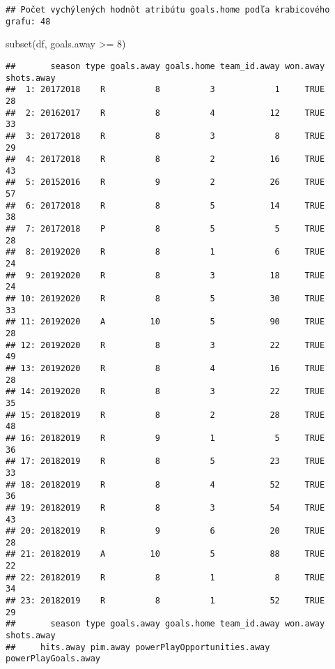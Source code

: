 \documentclass[
]{article}
\newenvironment{Shaded}{\begin{snugshade}}{\end{snugshade}}
\newcommand{\DecValTok}[1]{\textcolor[rgb]{0.00,0.00,0.81}{#1}}
\newcommand{\FunctionTok}[1]{\textcolor[rgb]{0.00,0.00,0.00}{#1}}
\newcommand{\NormalTok}[1]{#1}
\newcommand{\SpecialCharTok}[1]{\textcolor[rgb]{0.00,0.00,0.00}{#1}}
\begin{document}
\begin{verbatim}
## Počet vychýlených hodnôt atribútu goals.home podľa krabicového grafu: 48
\end{verbatim}

\begin{Shaded}
\begin{Highlighting}[]
\FunctionTok{subset}\NormalTok{(df, goals.away }\SpecialCharTok{\textgreater{}=} \DecValTok{8}\NormalTok{)}
\end{Highlighting}
\end{Shaded}

\begin{verbatim}
##       season type goals.away goals.home team_id.away won.away shots.away
##  1: 20172018    R          8          3            1     TRUE         28
##  2: 20162017    R          8          4           12     TRUE         33
##  3: 20172018    R          8          3            8     TRUE         29
##  4: 20172018    R          8          2           16     TRUE         43
##  5: 20152016    R          9          2           26     TRUE         57
##  6: 20172018    R          8          5           14     TRUE         38
##  7: 20172018    P          8          5            5     TRUE         28
##  8: 20192020    R          8          1            6     TRUE         24
##  9: 20192020    R          8          3           18     TRUE         24
## 10: 20192020    R          8          5           30     TRUE         33
## 11: 20192020    A         10          5           90     TRUE         28
## 12: 20192020    R          8          3           22     TRUE         49
## 13: 20192020    R          8          4           16     TRUE         28
## 14: 20192020    R          8          3           22     TRUE         35
## 15: 20182019    R          8          2           28     TRUE         48
## 16: 20182019    R          9          1            5     TRUE         36
## 17: 20182019    R          8          5           23     TRUE         33
## 18: 20182019    R          8          4           52     TRUE         36
## 19: 20182019    R          8          3           54     TRUE         43
## 20: 20182019    R          9          6           20     TRUE         28
## 21: 20182019    A         10          5           88     TRUE         22
## 22: 20182019    R          8          1            8     TRUE         34
## 23: 20182019    R          8          1           52     TRUE         29
##       season type goals.away goals.home team_id.away won.away shots.away
##     hits.away pim.away powerPlayOpportunities.away powerPlayGoals.away

\end{verbatim}
\end{document}
